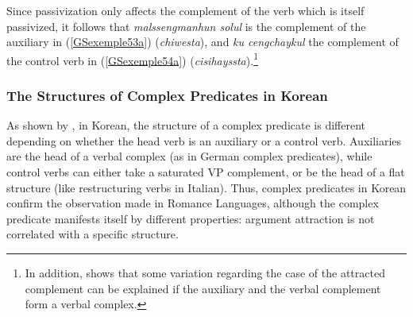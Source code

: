 \documentclass[output=paper
                ,modfonts
                ,nonflat
	        ,collection
	        ,collectionchapter
	        ,collectiontoclongg
 	        ,biblatex
                ,babelshorthands
                ,newtxmath
                ,draftmode
                ,colorlinks, citecolor=brown
]{./langsci/langscibook}
\begin{document}
{\begin{exe}
\begin{xlist}
	    \label{GSexemple53b}
		\end{xlist}
\end{exe}


\begin{exe}
	\ex \label{GSexemple54} 
	\begin{xlist}
        \label{GSexemple54a}
		
	    \label{GSexemple54b}
		\end{xlist}
\end{exe}

Since passivization only affects the complement of the verb which is itself passivized, it follows that \textit{malssengmanhun solul} is the complement of the auxiliary in (\ref{GSexemple53a}) (\textit{chiwesta}), and \textit{ku cengchaykul} the complement of the control verb in (\ref{GSexemple54a}) (\textit{cisihayssta}).\footnote{In addition, \cite{Yoo2003} shows that some variation regarding the case of the attracted complement can be explained if the auxiliary and the verbal complement form a verbal complex.}

\subsubsection{The Structures of Complex Predicates in Korean}\label{GSsection4.2.2}
 
As shown by \cite{CC1998}, in Korean, the structure of a complex predicate is different depending on whether the head verb is an auxiliary or a control verb. Auxiliaries are the head of a verbal complex (as in German complex predicates), while control verbs can either take a saturated VP complement, or be the head of a flat structure (like restructuring verbs in Italian). Thus, complex predicates in Korean confirm the observation made in Romance Languages, although the complex predicate manifests itself by different properties: argument attraction is not correlated with a specific structure. 

}
\end{document}
